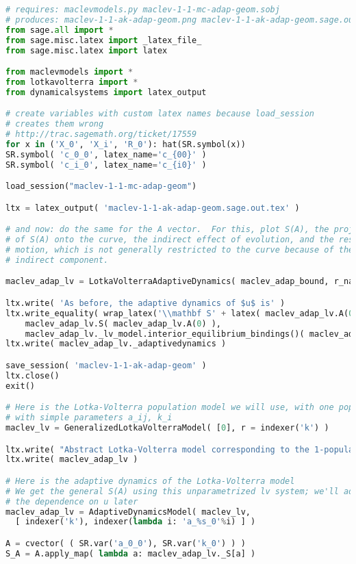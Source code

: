 \begin{lstlisting}[language=Python]
# requires: maclevmodels.py maclev-1-1-mc-adap-geom.sobj
# produces: maclev-1-1-ak-adap-geom.png maclev-1-1-ak-adap-geom.sage.out.tex
from sage.all import *
from sage.misc.latex import _latex_file_
from sage.misc.latex import latex

from maclevmodels import *
from lotkavolterra import *
from dynamicalsystems import latex_output

# create variables with custom latex names because load_session
# creates them wrong
# http://trac.sagemath.org/ticket/17559
for x in ('X_0', 'X_i', 'R_0'): hat(SR.symbol(x))
SR.symbol( 'c_0_0', latex_name='c_{00}' )
SR.symbol( 'c_i_0', latex_name='c_{i0}' )

load_session("maclev-1-1-mc-adap-geom")

ltx = latex_output( 'maclev-1-1-ak-adap-geom.sage.out.tex' )

# and now: do the same for the A vector.  For this, plot S(A), the projection
# of S(A) onto the curve, the indirect effect of evolution, and the resultant
# motion, which is not generally restricted to the curve because of the
# indirect component.

maclev_adap_lv = LotkaVolterraAdaptiveDynamics( maclev_adap_bound, r_name='k' )

ltx.write( 'As before, the adaptive dynamics of $u$ is' )
ltx.write_equality( wrap_latex('\\mathbf S' + latex( maclev_adap_lv.A(0) )),
    maclev_adap_lv.S( maclev_adap_lv.A(0) ),
    maclev_adap_lv._lv_model.interior_equilibrium_bindings()( maclev_adap_lv.S( maclev_adap_lv.A(0) ) ) )
ltx.write( maclev_adap_lv._adaptivedynamics )

save_session( 'maclev-1-1-ak-adap-geom' )
ltx.close()
exit()

# Here is the Lotka-Volterra population model we will use, with one population,
# with simple parameters a_ij, k_i
maclev_lv = GeneralizedLotkaVolterraModel( [0], r = indexer('k') )

ltx.write( "Abstract Lotka-Volterra model corresponding to the 1-population Mac-Lev model:" )
ltx.write( maclev_adap_lv )

# Here is the adaptive dynamics of the Lotka-Volterra model
# We get the general S(A) using this unparametrized lv system; we'll add
# the dependence on u later
maclev_adap_lv = AdaptiveDynamicsModel( maclev_lv,
  [ indexer('k'), indexer(lambda i: 'a_%s_0'%i) ] )

A = cvector( ( SR.var('a_0_0'), SR.var('k_0') ) )
S_A = A.apply_map( lambda a: maclev_adap_lv._S[a] )


\end{lstlisting}

